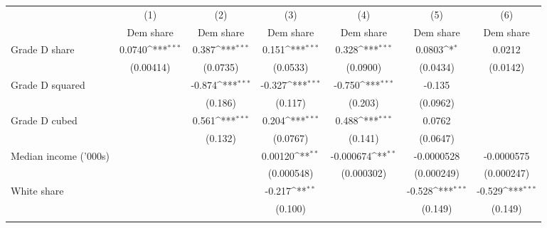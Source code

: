 {
\def\sym#1{\ifmmode^{#1}\else\(^{#1}\)\fi}
\begin{tabular}{l*{6}{c}}
\toprule
                    &\multicolumn{1}{c}{(1)}&\multicolumn{1}{c}{(2)}&\multicolumn{1}{c}{(3)}&\multicolumn{1}{c}{(4)}&\multicolumn{1}{c}{(5)}&\multicolumn{1}{c}{(6)}\\
                    &\multicolumn{1}{c}{Dem share}&\multicolumn{1}{c}{Dem share}&\multicolumn{1}{c}{Dem share}&\multicolumn{1}{c}{Dem share}&\multicolumn{1}{c}{Dem share}&\multicolumn{1}{c}{Dem share}\\
\midrule
Grade D share       &      0.0740\sym{***}&       0.387\sym{***}&       0.151\sym{***}&       0.328\sym{***}&      0.0803\sym{*}  &      0.0212         \\
                    &   (0.00414)         &    (0.0735)         &    (0.0533)         &    (0.0900)         &    (0.0434)         &    (0.0142)         \\
\addlinespace
Grade D squared     &                     &      -0.874\sym{***}&      -0.327\sym{***}&      -0.750\sym{***}&      -0.135         &                     \\
                    &                     &     (0.186)         &     (0.117)         &     (0.203)         &    (0.0962)         &                     \\
\addlinespace
Grade D cubed       &                     &       0.561\sym{***}&       0.204\sym{***}&       0.488\sym{***}&      0.0762         &                     \\
                    &                     &     (0.132)         &    (0.0767)         &     (0.141)         &    (0.0647)         &                     \\
\addlinespace
Median income ('000s)&                     &                     &     0.00120\sym{**} &   -0.000674\sym{**} &  -0.0000528         &  -0.0000575         \\
                    &                     &                     &  (0.000548)         &  (0.000302)         &  (0.000249)         &  (0.000247)         \\
\addlinespace
White share         &                     &                     &      -0.217\sym{**} &                     &      -0.528\sym{***}&      -0.529\sym{***}\\
                    &                     &                     &     (0.100)         &                     &     (0.149)         &     (0.149)         \\
\addlinespace

\end{tabular}}
